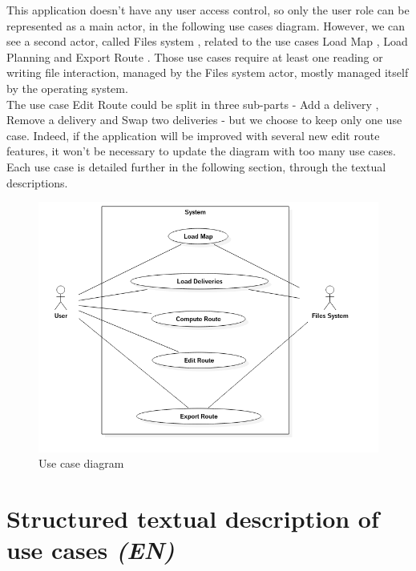 \documentclass[paper=a4,fontsize=11pt]{report}
\numberwithin{equation}{section}		%
\numberwithin{figure}{section}		%
\numberwithin{table}{section}		%
\renewcommand{\it}[1]{\textit{#1}}
\begin{document}
This application doesn’t have any user access control, so only the user role can be represented as a main actor, in the following use cases diagram. However, we can see a second actor, called \og Files system \fg{}, related to the use cases \og Load Map \fg{}, \og Load Planning \fg{} and \og Export Route \fg{}. Those use cases require at least one reading or writing file interaction, managed by the \og Files system \fg{} actor, mostly managed itself by the operating system.\\

The use case \og Edit Route \fg{} could be split in three sub-parts - \og Add a delivery \fg{}, \og Remove a delivery \fg{} and \og Swap two deliveries \fg{} - but we choose to keep only one use case. Indeed, if the application will be improved with several new edit route features, it won’t be necessary to update the diagram with too many use cases.\\

Each use case is detailed further in the following section, through the textual descriptions.

\begin{figure}[H]
\centering
\includegraphics[scale=0.5,angle=0]{figures/use-case.png}
\caption{Use case diagram}
\end{figure}

\section{Structured textual description of use cases \it{(EN)}}
\label{sec:structured-textual-description-of-use-cases}
\end{document}
